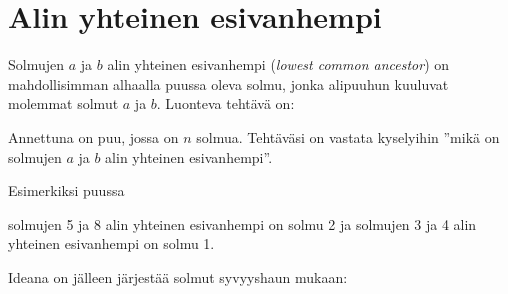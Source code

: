 \section{Alin yhteinen esivanhempi}

Solmujen $a$ ja $b$
alin yhteinen esivanhempi (\textit{lowest common ancestor})
on mahdollisimman alhaalla puussa oleva solmu,
jonka alipuuhun kuuluvat molemmat solmut $a$ ja $b$.
Luonteva tehtävä on:

\begin{task}
Annettuna on puu, jossa on $n$ solmua.
Tehtäväsi on vastata kyselyihin
''mikä on solmujen $a$ ja $b$ alin yhteinen esivanhempi''.
\end{task}


\begin{samepage}
Esimerkiksi puussa

\begin{center}
\end{center}
\end{samepage}

solmujen 5 ja 8 alin yhteinen esivanhempi on solmu 2
ja solmujen 3 ja 4 alin yhteinen esivanhempi on solmu 1.

Ideana on jälleen järjestää solmut syvyyshaun mukaan:

